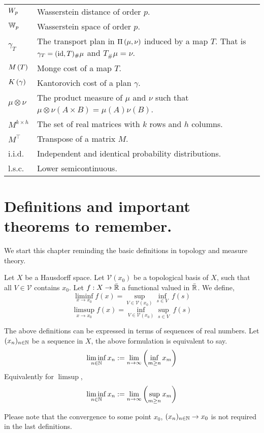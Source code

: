 \begin{tabular}{ l l }
	$W_{p}$ & Wasserstein distance of order $p$. \\	
	$\mathbb{W}_{p}$ & Wasserstein space of order $p$.\\
 	$\gamma_T$ & The transport plan in $\Pi\left(\mu, \nu\right)$ induced by a map $T$. That is $\gamma_T = (\mathrm{id}, T)_\#\mu$ and $T_\#\mu=\nu$. \\
	$M\left(T\right)$ & Monge cost of a map $T$. \\
	$K\left(\gamma\right)$ & Kantorovich cost of a plan $\gamma$. \\	
	$\mu \otimes \nu$ & The product measure of $\mu$ and $\nu$ such that $\mu \otimes \nu (A\times B)= \mu(A)\nu(B)$.\\
	$M^{k\times h}$ & The set of real matrices with $k$ rows and $h$ columns. \\
	$M^\top$ & Transpose of a matrix $M$. \\
	i.i.d. & Independent and identical probability distributions.\\
	l.s.c. & Lower semicontinuous.
\end{tabular}



\section{Definitions and important theorems to remember.}

We start this chapter reminding the basic definitions in topology and measure theory.
\begin{definition}[]
\end{definition}


\begin{definition}
	Let $X$ be a Hausdorff space. Let $\mathcal{V}(x_0)$ be a topological basis of $X$, such that all $V\in \mathcal{V}$ contains $x_0$. Let $f: X\rightarrow \bar{\mathbb{R}}$ a functional valued in $\bar{\mathbb{R}}$. We define, 
	\begin{equation*}
	\liminf_{x\rightarrow x_0} f(x)= \sup_{V\in \mathcal{V}(x_0)} \inf_{s\in V}\ f(s)
	\end{equation*}
	\begin{equation*}
	\limsup_{x\rightarrow x_0} f(x)= \inf_{V\in \mathcal{V}(x_0)} \sup_{s\in V}\ f(s)
	\end{equation*}
	
The above definitions can be expressed in terms of sequences of real numbers. Let $(x_n)_{n \in \mathbb{N}}$ be a sequence in $X$, the above formulation is equivalent to say.
\begin{equation*}
	\liminf_{n\in \mathbb{N}} x_n := \lim_{n\rightarrow \infty} \left( \inf_{m\geq n} x_m \right)
\end{equation*}
Equivalently for $\limsup$,
	\begin{equation*}
	\liminf_{n\in \mathbb{N}} x_n := \lim_{n\rightarrow \infty} \left( \sup_{m\geq n} x_m \right)
	\end{equation*}

Please note that the convergence to some point $x_0$, $(x_n)_{n\in \mathbb{N}}\rightarrow x_0$ is not required in the last definitions.
\end{definition}

